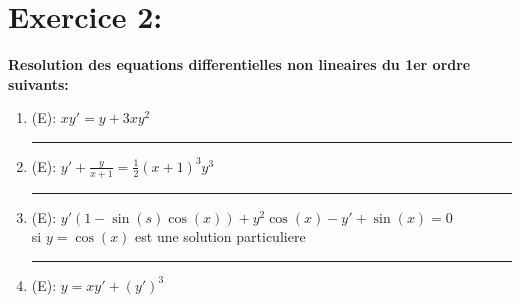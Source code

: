 \documentclass[a4paper,12pt]{article}
\begin{document}

\section*{Exercice 2:}
\textbf{Resolution des equations differentielles non lineaires du 1er ordre suivants:}

\begin{enumerate}
	\vspace{1cm}
	\item (E): $xy' = y + 3xy^2$ \\
	
	
	\vspace{1cm}
	\hrule
	\vspace{1cm}
	
	\item (E): $y' + \frac{y}{x+1} = \frac{1}{2} (x+1)^3 y^3$ \\
	
	
	\vspace{1cm}
	\hrule
	\vspace{1cm}
	
	\item (E): $y' (1 -\sin(s)\cos(x)) + y^2\cos(x) -y' + \sin(x) = 0$ \\ si $y = \cos(x)$ est une solution particuliere
	
	
	\vspace{1cm}
	\hrule
	\vspace{1cm}
	
	\item (E): $y = xy' + (y')^3$
	 \\
	
	\vspace{1cm}
\end{enumerate}
\end{document}
